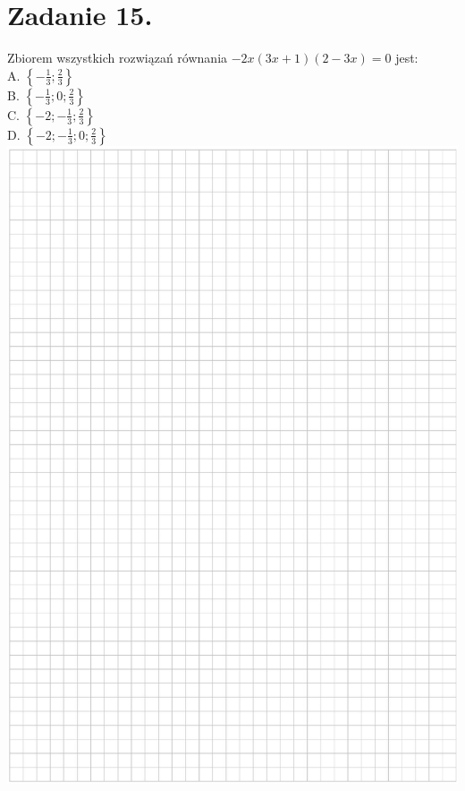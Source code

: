 \documentclass[10pt]{article}
\begin{document}
\section*{Zadanie 15.}
Zbiorem wszystkich rozwiązań równania \(-2 x(3 x+1)(2-3 x)=0\) jest:\\
A. \(\left\{-\frac{1}{3} ; \frac{2}{3}\right\}\)\\
B. \(\left\{-\frac{1}{3} ; 0 ; \frac{2}{3}\right\}\)\\
C. \(\left\{-2 ;-\frac{1}{3} ; \frac{2}{3}\right\}\)\\
D. \(\left\{-2 ;-\frac{1}{3} ; 0 ; \frac{2}{3}\right\}\)\\
\includegraphics[max width=\textwidth, center]{2024_11_21_94f02db55673a8a7b820g-07}
\end{document}
